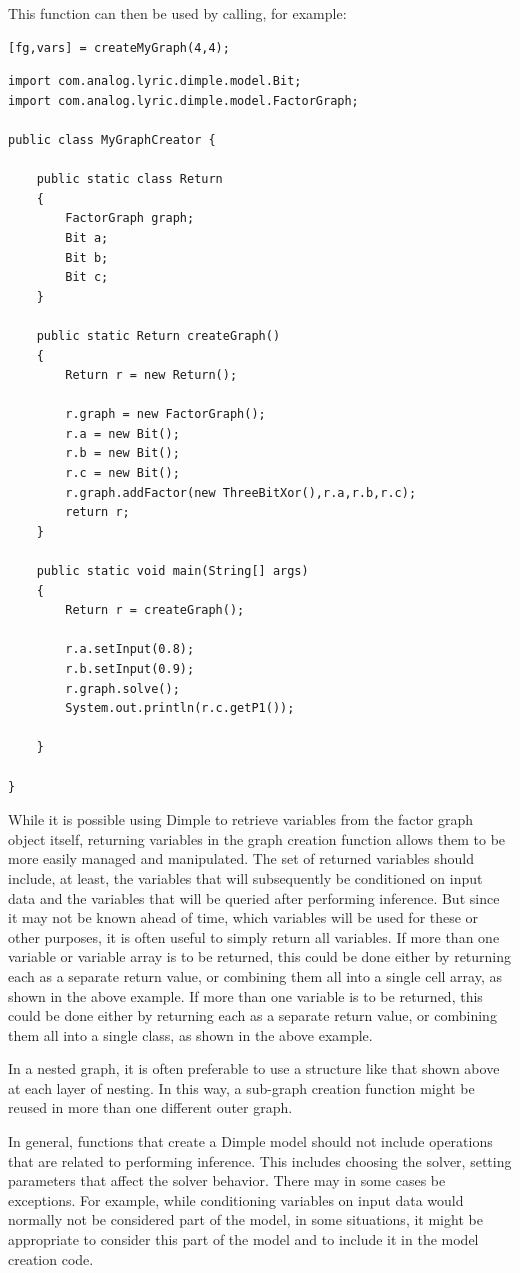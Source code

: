This function can then be used by calling, for example:

\begin{lstlisting}
[fg,vars] = createMyGraph(4,4);
\end{lstlisting}

\fi

\ifjava
\begin{lstlisting}
import com.analog.lyric.dimple.model.Bit;
import com.analog.lyric.dimple.model.FactorGraph;

public class MyGraphCreator {

	public static class Return
	{
		FactorGraph graph;
		Bit a;
		Bit b;
		Bit c;
	}
	
	public static Return createGraph()
	{
		Return r = new Return();
		
		r.graph = new FactorGraph();
		r.a = new Bit();
		r.b = new Bit();
		r.c = new Bit();
		r.graph.addFactor(new ThreeBitXor(),r.a,r.b,r.c);
		return r;
	}
	
	public static void main(String[] args) 
	{
		Return r = createGraph();
		
		r.a.setInput(0.8);
		r.b.setInput(0.9);
		r.graph.solve();
		System.out.println(r.c.getP1());

	}

}
\end{lstlisting}
\fi

While it is possible using Dimple to retrieve variables from the factor graph object itself, returning variables in the graph creation function allows them to be more easily managed and manipulated.  The set of returned variables should include, at least, the variables that will subsequently be conditioned on input data and the variables that will be queried after performing inference.  But since it may not be known ahead of time, which variables will be used for these or other purposes, it is often useful to simply return all variables.  \ifmatlab If more than one variable or variable array is to be returned, this could be done either by returning each as a separate return value, or combining them all into a single cell array, as shown in the above example.  \fi   \ifjava If more than one variable is to be returned, this could be done either by returning each as a separate return value, or combining them all into a single class, as shown in the above example.  \fi

In a nested graph, it is often preferable to use a structure like that shown above at each layer of nesting.  In this way, a sub-graph creation function might be reused in more than one different outer graph.

In general, functions that create a Dimple model should not include operations that are related to performing inference.  This includes choosing the solver, setting parameters that affect the solver behavior.  There may in some cases be exceptions.  For example, while conditioning variables on input data would normally not be considered part of the model, in some situations, it might be appropriate to consider this part of the model and to include it in the model creation code.



